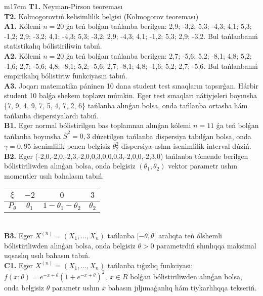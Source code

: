 \documentclass{article}
\begin{document}
\begin{tabular}{m{17cm}}
\textbf{T1.} 
Neyman-Pirson teoreması
 \\
\textbf{T2.} 
Kolmogorovtıń kelisimlilik belgisi (Kolmogorov teoreması)
 \\
\textbf{A1.} 
Kólemi \(n = 20\) ǵa teń bolǵan tańlanba berilgen: 2,9; -3,2; 5,3; -4,3; 4,1; 5,3; -1,2; 2,9; -3,2; 4,1; -4,3; 5,3; -3,2; 2,9; -4,3; 4,1; -1,2; 5,3; 2,9; -3,2. Bul tańlanbanıń statistikalıq bólistiriliwin tabıń.
 \\
\textbf{A2.} 
Kólemi \(n = 20\) ǵa teń bolǵan tańlanba berilgen: 2,7; -5,6; 5,2; -8,1; 4,8; 5,2; -1,6; 2,7; -5,6; 4,8; -8,1; 5,2; -5,6; 2,7; -8,1; 4,8; -1,6; 5,2; 2,7; -5,6. Bul tańlanbanıń empirikalıq bólistiriw funkciyasın tabıń.
 \\
\textbf{A3.} 
Joqarı matematika páninen 10 dana student test sınaqların tapsırǵan. Hárbir student 10 balǵa shekem toplawı múmkin. Eger test sınaqları nátiyjeleri boyınsha \{7, 9, 4, 9, 7, 5, 4, 7, 2, 6\} tańlanba alınǵan bolsa, onda tańlanba ortasha hám tańlanba dispersiyalardı tabıń.
 \\
\textbf{B1.} 
Eger normal bólistirilgen bas toplamnan alınǵan kólemi \(n = 11\) ǵa teń bolǵan tańlanba boyınsha \({\overline{S}}^{2} = 0,3\) dúzetilgen tańlanba dispersiya tabılǵan bolsa, onda \(\gamma = 0,95\) isenimlilik penen belgisiz \(\theta_{2}^{2}\) dispersiya ushın isenimlilik interval dúziń.
 \\
\textbf{B2.} 
Eger (-2,0,-2,0,-2,3,-2,0,0,3,0,0,0,3,-2,0,0,-2,3,0) tańlanba tómende berilgen bólistiriliwden alınǵan bolsa, onda belgisiz \(\left( \theta_{1},\theta_{2} \right)\) vektor parametr ushın momentler usılı bahalasın tabıń.
\begin{tabular}{|c|c|c|c|}
  \hline
$\xi$ &
$- 2$ &
$0$ &
$3$\\
\hline
\(P_{\theta}\) & \(\theta_{1}\) & \(1 - \theta_{1} - \theta_{2}\) & \(\theta_{2}\) \\
\hline
\end{tabular}
 \\
\textbf{B3.} 
Eger \(X^{(n)} = \left( X_{1},...,X_{n} \right)\) tańlanba \(\lbrack - \theta,\theta\rbrack\) aralıqta teń ólshemli bólistiriliwden alınǵan bolsa, onda belgisiz \(\theta > 0\) parametrdiń shınlıqqa maksimal uqsaslıq usılı bahasın tabıń.
 \\
\textbf{C1.} 
Eger \(X^{(n)} = \left( X_{1},...,X_{n} \right)\) tańlanba tıǵızlıq funkciyası: \(f(x;\theta) = e^{- x + \theta}\left( 1 + e^{- x + \theta} \right)^{2},\ x \in R\)
bolǵan bólistiriliwden alınǵan bolsa, onda belgisiz \(\theta\) parametr ushın \(\overline{x}\) bahasın jıljımaǵanlıq hám tiykarlılıqqa tekseriń.

\end{tabular}
\end{document}
